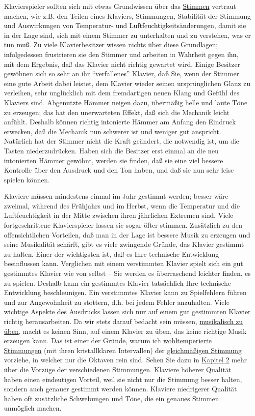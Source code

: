Klavierspieler sollten sich mit etwas Grundwissen über das \hyperref[c2_1]{Stimmen} vertraut machen, wie z.B. den Teilen eines Klaviers, Stimmungen, Stabilität der Stimmung und Auswirkungen von Temperatur- und Luftfeuchtigkeitsänderungen, damit sie in der Lage sind, sich mit einem Stimmer zu unterhalten und zu verstehen, was er tun muß.
Zu viele Klavierbesitzer wissen nichts über diese Grundlagen; infolgedessen frustrieren sie den Stimmer und arbeiten in Wahrheit gegen ihn, mit dem Ergebnis, daß das Klavier nicht richtig gewartet wird.
Einige Besitzer gewöhnen sich so sehr an ihr \enquote{verfallenes} Klavier, daß Sie, wenn der Stimmer eine gute Arbeit dabei leistet, dem Klavier wieder seinen ursprünglichen Glanz zu verleihen, sehr unglücklich mit dem fremdartigen neuen Klang und Gefühl des Klaviers sind.
Abgenutzte Hämmer neigen dazu, übermäßig helle und laute Töne zu erzeugen; das hat den unerwarteten Effekt, daß sich die Mechanik leicht anfühlt.
Deshalb können richtig intonierte Hämmer am Anfang den Eindruck erwecken, daß die Mechanik nun schwerer ist und weniger gut anspricht.
Natürlich hat der Stimmer nicht die Kraft geändert, die notwendig ist, um die Tasten niederzudrücken.
Haben sich die Besitzer erst einmal an die neu intonierten Hämmer gewöhnt, werden sie finden, daß sie eine viel bessere Kontrolle über den Ausdruck und den Ton haben, und daß sie nun sehr leise spielen können.

Klaviere müssen mindestens einmal im Jahr gestimmt werden; besser wäre zweimal, während des Frühjahrs und im Herbst, wenn die Temperatur und die Luftfeuchtigkeit in der Mitte zwischen ihren jährlichen Extremen sind.
Viele fortgeschrittene Klavierspieler lassen sie sogar öfter stimmen.
Zusätzlich zu den offensichtlichen Vorteilen, daß man in der Lage ist bessere Musik zu erzeugen und seine Musikalität schärft, gibt es viele zwingende Gründe, das Klavier gestimmt zu halten.
Einer der wichtigsten ist, daß es Ihre technische Entwicklung beeinflussen kann.
Verglichen mit einem verstimmten Klavier spielt sich ein gut gestimmtes Klavier wie von selbst -- Sie werden es überraschend leichter finden, es zu spielen.
Deshalb kann ein gestimmtes Klavier tatsächlich Ihre technische Entwicklung beschleunigen.
Ein verstimmtes Klavier kann zu Spielfehlern führen und zur Angewohnheit zu stottern, d.h. bei jedem Fehler anzuhalten.
Viele wichtige Aspekte des Ausdrucks lassen sich nur auf einem gut gestimmten Klavier richtig herausarbeiten.
Da wir stets darauf bedacht sein müssen, \hyperref[c1iii14d]{musikalisch zu üben}, macht es keinen Sinn, auf einem Klavier zu üben, das keine richtige Musik erzeugen kann.
Das ist einer der Gründe, warum ich \hyperref[c2_2_wtk2]{wohltemperierte Stimmungen} (mit ihren kristallklaren Intervallen) der \hyperref[c2_6_et]{gleichmäßigen Stimmung} vorziehe, in welcher nur die Oktaven rein sind.
Sehen Sie dazu in \hyperref[c2_1]{Kapitel 2} mehr über die Vorzüge der verschiedenen Stimmungen.
Klaviere höherer Qualität haben einen eindeutigen Vorteil, weil sie nicht nur die Stimmung besser halten, sondern auch genauer gestimmt werden können.
Klaviere niedrigerer Qualität haben oft zusätzliche Schwebungen und Töne, die ein genaues Stimmen unmöglich machen.

